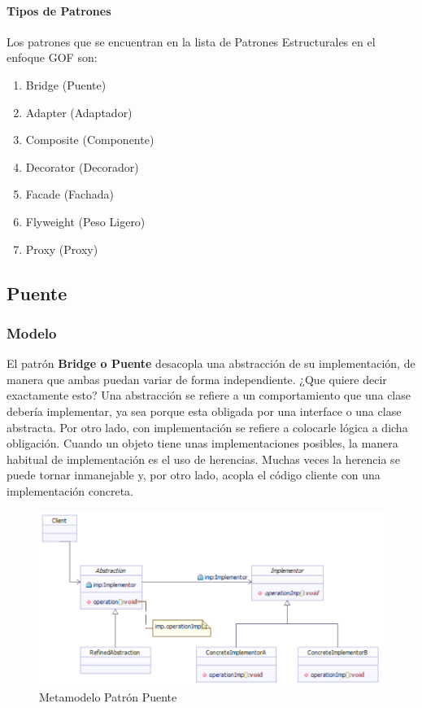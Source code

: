 \paragraph{Tipos de Patrones}
Los patrones que se encuentran en la lista de Patrones Estructurales en el enfoque GOF son:
\begin{enumerate}
	\item Bridge (Puente)
	\item Adapter (Adaptador)
	\item Composite (Componente)
	\item Decorator (Decorador)
	\item Facade (Fachada)
	\item Flyweight (Peso Ligero) 
	\item Proxy (Proxy)
\end{enumerate}

\subsection{Puente}
	
\subsubsection{Modelo}

El patrón \textbf{Bridge o Puente} desacopla una abstracción de su implementación, de manera que ambas puedan variar de forma independiente. ¿Que quiere decir exactamente esto? Una abstracción se refiere a un comportamiento que una clase debería implementar, ya sea porque esta obligada por una interface o una clase abstracta. Por otro lado, con implementación se refiere a colocarle lógica a dicha obligación. Cuando un objeto tiene unas implementaciones posibles, la manera habitual de implementación es el uso de herencias. Muchas veces la herencia se puede tornar inmanejable y, por otro lado, acopla el código cliente con una implementación concreta. 

\begin{figure}[th!]
	\centering
	\includegraphics[width=1\linewidth]{arquitectura/imagenes/modeloPuente}
	\caption{Metamodelo Patrón Puente}
	\label{fig:puente}
\end{figure}

